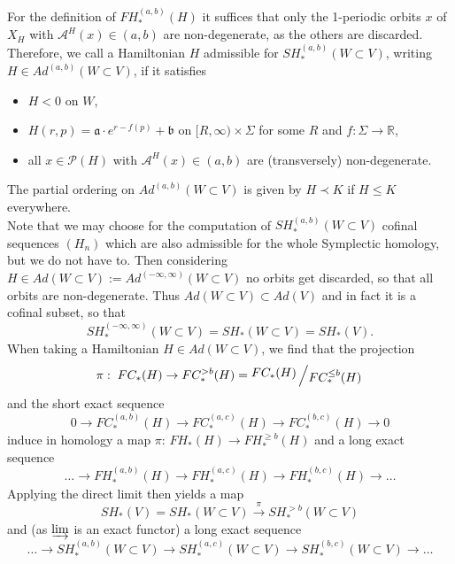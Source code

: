 \documentclass[a4paper,12pt,bibliography=totocnumbered,titlepage=false,abstracton,bookmarksnumbered=true]{scrartcl}
\theoremstyle{definition}
\begin{document}
For the definition of $FH^{(a,b)}_\ast(H)$ it suffices that only the 1-periodic orbits $x$ of $X_H$ with $\mathcal{A}^H(x)\in(a,b)$ are non-degenerate, as the others are discarded. Therefore, we call a Hamiltonian $H$ admissible for $SH^{(a,b)}_\ast(W{\subset}V)$, writing $H\in Ad^{(a,b)}(W{\subset}V)$, if it satisfies
\begin{itemize}
 \item $H<0$ on $W$,
 \item $H(r,p)=\mathfrak{a}\cdot e^{r-f(p)}+\mathfrak{b}$ on $[R,\infty)\times\Sigma$ for some $R$ and $f:\Sigma\rightarrow\mathbb{R}$,
 \item all $x\in\mathcal{P}(H)$ with $\mathcal{A}^H(x)\in(a,b)$ are (transversely) non-degenerate.
\end{itemize}
The partial ordering on $Ad^{(a,b)}(W{\subset}V)$ is given by $H\prec K$ if $H\leq K$ everywhere.\\
Note that we may choose for the computation of $SH^{(a,b)}_\ast(W{\subset}V)$ cofinal sequences $(H_n)$ which are also admissible for the whole Symplectic homology, but we do not have to. Then considering $H\in Ad(W{\subset}V):=Ad^{(-\infty,\infty)}(W{\subset}V)$ no orbits get discarded, so that all orbits are non-degenerate. Thus $Ad(W{\subset}V)\subset Ad(V)$ and in fact it is a cofinal subset, so that
\[SH_\ast^{(-\infty,\infty)}(W{\subset}V)=SH_\ast(W{\subset}V)=SH_\ast(V).\]
When taking a Hamiltonian $H\in Ad(W{\subset}V)$, we find that the projection
\[\pi:\;FC_\ast(H)\rightarrow FC_\ast^{> b}(H)=\raisebox{.2em}{$FC_\ast(H)$}\left/\raisebox{-.2em}{$FC^{\leq b}_\ast(H)$}\right.\]
and the short exact sequence
\[0\rightarrow FC_\ast^{(a,b)}(H)\rightarrow FC_\ast^{(a,c)}(H)\rightarrow FC_\ast^{(b,c)}(H)\rightarrow 0\]
induce in homology a map $\pi:\,FH_\ast(H)\rightarrow FH_\ast^{\geq b}(H)$ and a long exact sequence
\[\dots\rightarrow FH_\ast^{(a,b)}(H)\rightarrow FH_\ast^{(a,c)}(H)\rightarrow FH_\ast^{(b,c)}(H)\rightarrow\dots\]
Applying the direct limit then yields a map
\[SH_\ast(V)=SH_\ast(W{\subset}V)\overset{\pi}\longrightarrow SH_\ast^{> b}(W{\subset}V)\]
and (as $\displaystyle\varinjlim$ is an exact functor) a long exact sequence
\[\dots\rightarrow SH^{(a,b)}_\ast(W{\subset}V)\rightarrow SH^{(a,c)}_\ast(W{\subset}V)\rightarrow SH^{(b,c)}_\ast(W{\subset}V)\rightarrow\dots\]
\end{document}
